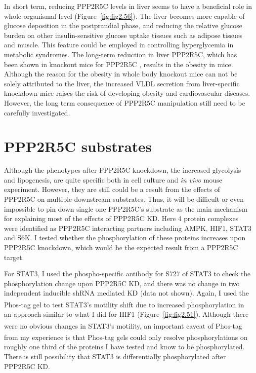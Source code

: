 In short term, reducing PPP2R5C levels in liver seems to have a beneficial role in whole organismal level (Figure~\ref{fig:fig2.56}). The liver becomes more capable of glucose deposition in the postprandial phase, and reducing the relative glucose burden on other insulin-sensitive glucose uptake tissues such as adipose tissues and muscle. This feature could be employed in controlling hyperglycemia in metabolic syndromes. The long-term reduction in liver PPP2R5C, which has been shown in knockout mice for PPP2R5C \cite{varadkar_protein_2014}, results in the obesity in mice. Although the reason for the obesity in whole body knockout mice can not be solely attributed to the liver, the increased VLDL secretion from liver-specific knockdown mice raises the risk of developing obesity and cardiovascular diseases. However, the long term consequence of PPP2R5C manipulation still need to be carefully investigated. 


\section{PPP2R5C substrates}

Although the phenotypes after PPP2R5C knockdown, the increased glycolysis and lipogenesis, are quite specific both in cell culture and \textit{in vivo} mouse experiment. However, they are still could be a result from the effects of PPP2R5C on multiple downstream substrates. Thus, it will be difficult or even impossible to pin down single one PPP2R5C's substrate as the main mechanism for explaining most of the effects of PPP2R5C KD. Here 4 protein complexes were identified as PPP2R5C interacting partners including AMPK, HIF1\textalpha{}, STAT3 and S6K. I tested whether the phosphorylation of these proteins increases upon PPP2R5C knockdown, which would be the expected result from a PPP2R5C target. 

For STAT3, I used the phospho-specific antibody for S727 of STAT3 to check the phosphorylation change upon PPP2R5C KD, and there was no change in two independent inducible shRNA mediated KD (data not shown). Again, I used the Phos-tag\textsuperscript{\textregistered} gel  to test STAT3's motility shift due to increased phosphorylation in an approach similar to what I did for HIF1\textalpha{} (Figure~\ref{fig:fig2.51}). Although there were no obvious changes in STAT3's motility, an important caveat of Phos-tag\textsuperscript{\textregistered} from my experience is that Phos-tag\textsuperscript{\textregistered} gels could only resolve phosphorylations on roughly one third of the proteins I have tested and know to be phosphorylated. There is still possibility that STAT3 is differentially phosphorylated after PPP2R5C KD.

